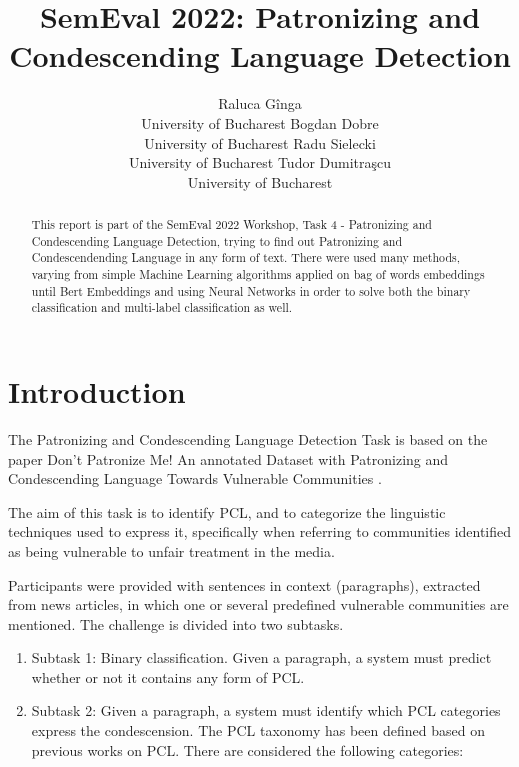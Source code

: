 \documentclass[11pt]{article}
\begin{document}
\title{SemEval 2022: Patronizing and Condescending Language Detection}
\author{Raluca G\^inga \\
    University of Bucharest
    \And Bogdan Dobre \\
    University of Bucharest
    \And Radu Sielecki \\
    University of Bucharest
    \And Tudor Dumitra\c{s}cu\\
    University of Bucharest
    }
\date{}
\maketitle

\begin{abstract}
This report is part of the SemEval 2022 Workshop, Task 4 - Patronizing and
Condescending Language Detection, trying to find out Patronizing and
Condescendending Language in any form of text. There were used many methods,
varying from simple Machine Learning algorithms applied on bag of words
embeddings until Bert Embeddings and using Neural Networks in order to solve
both the binary classification and multi-label classification as well.
\end{abstract}

\section{Introduction}

The Patronizing and Condescending Language Detection Task is based on the
paper Don't Patronize Me! An annotated Dataset with Patronizing and
Condescending Language Towards Vulnerable Communities \cite{perezalmendros2020dont}.

The aim of this task is to identify PCL, and to categorize the linguistic
techniques used to express it, specifically when referring to communities
identified as being vulnerable to unfair treatment in the media.

Participants were provided with sentences in context (paragraphs), extracted
from news articles, in which one or several predefined vulnerable
communities are mentioned. The challenge is divided into two subtasks.

\begin{enumerate}
\item Subtask 1: Binary classification. Given a paragraph, a system must
predict whether or not it contains any form of PCL.

\item Subtask 2: Given a paragraph, a system must identify which PCL
categories express the condescension. The PCL taxonomy has been defined
based on previous works on PCL. There are considered the following
categories:
\end{enumerate}
\end{document}
